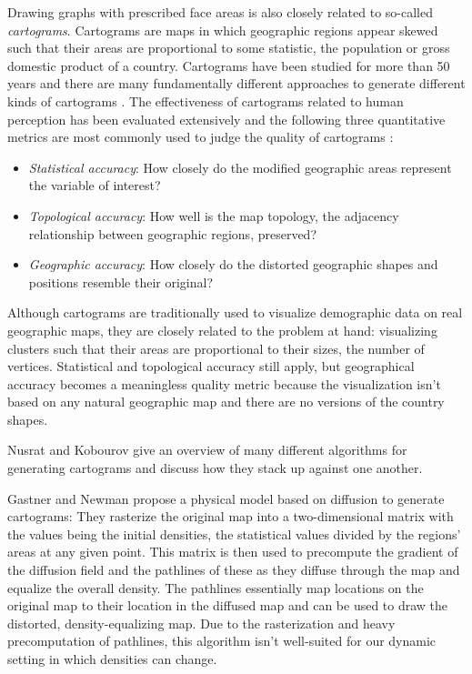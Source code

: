 Drawing graphs with prescribed face areas is also closely related to so-called \emph{cartograms}. Cartograms are maps in which geographic regions appear skewed such that their areas are proportional to some statistic, \eg{} the population or gross domestic product of a country. Cartograms have been studied for more than 50 years \cite{cartogram-history} and there are many fundamentally different approaches to generate different kinds of cartograms \cite{cartogram-state-of-the-art}. The effectiveness of cartograms related to human perception has been evaluated extensively  \cite{cartograms-effectiveness} and the following three quantitative metrics are most commonly used to judge the quality of cartograms \cite{cartogram-state-of-the-art} \cite{cartogram-quantitive-measures} \cite{cartograms-effectiveness}:
%
\begin{itemize}
	\item \emph{Statistical accuracy}: How closely do the modified geographic areas represent the variable of interest?
	\item \emph{Topological accuracy}: How well is the map topology, \ie{} the adjacency relationship between geographic regions, preserved?
	\item \emph{Geographic accuracy}: How closely do the distorted geographic shapes and positions resemble their original?
\end{itemize}

Although cartograms are traditionally used to visualize demographic data on real geographic maps, they are closely related to the problem at hand: visualizing clusters such that their areas are proportional to their sizes, \ie{} the number of vertices. Statistical and topological accuracy still apply, but geographical accuracy becomes a meaningless quality metric because the visualization isn't based on any natural geographic map and there are no  versions of the country shapes.

Nusrat and Kobourov \cite{cartogram-state-of-the-art} give an overview of many different algorithms for generating cartograms and discuss how they stack up against one another.

Gastner and Newman \cite{cartograms-diffusion} propose a physical model based on diffusion to generate cartograms: They rasterize the original map into a two-dimensional matrix with the values being the initial densities, \ie{} the statistical values divided by the regions' areas at any given point. This matrix is then used to precompute the gradient of the diffusion field and the pathlines of these  as they diffuse through the map and equalize the overall density. The pathlines essentially map locations on the original map to their location in the diffused map and can be used to draw the distorted, density-equalizing map. Due to the rasterization and heavy precomputation of pathlines, this algorithm isn't well-suited for our dynamic setting in which densities can change.

